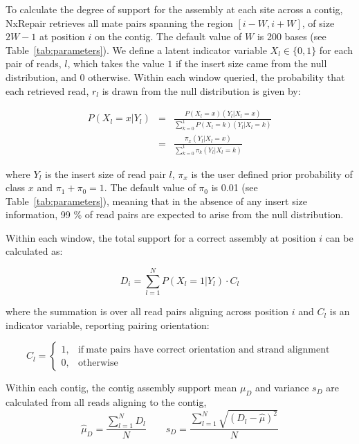 \documentclass[fleqn,10pt]{wlpeerj}
\begin{document}
To calculate the degree of support for the assembly at each site across a contig, NxRepair retrieves all mate pairs spanning the region $[i-W, i+W]$, of size $2W-1$ at position $i$ on the contig. The default value of $W$ is 200 bases (see Table~\ref{tab:parameters}). We define a latent indicator variable $X_l\in\{0,1\}$ for each pair of reads, $l$, which takes the value $1$ if the insert size came from the null distribution, and $0$ otherwise. Within each window queried, the probability that each retrieved read, $r_l$ is drawn from the null distribution is given by:

\begin{eqnarray} P(X_l=x|Y_l)& =& \frac{P(X_l=x)(Y_l|X_l=x)}{\sum_{k=0}^1P(X_l=k)(Y_l|X_l=k)}\\
  & =& \frac{\pi_x(Y_l|X_l=x)}{\sum_{k=0}^1 \pi_k(Y_l|X_l=k)}
\label{eq:posterior}  
\end{eqnarray}

where $Y_l$ is the insert size of read pair $l$, $\pi_x$ is the user defined prior probability of class $x$ and $\pi_1 + \pi_0 = 1$. The default value of $\pi_0$ is 0.01 (see Table~\ref{tab:parameters}), meaning that in the absence of any insert size information, 99 \% of read pairs are expected to arise from the null distribution.  

Within each window, the total support for a correct assembly at position $i$ can be calculated as:

\begin{equation}
D_i = \sum_{l=1}^N P(X_l=1|Y_l)\cdot C_l
\end{equation}

where the summation is over all read pairs aligning across position $i$ and $C_l$ is an indicator variable, reporting pairing orientation:

\begin{equation}
    C_l=
    \begin{cases}
      1, & \text{if}\ \text{mate pairs have correct orientation and strand alignment} \\
      0, & \text{otherwise}
    \end{cases}
  \label{eq:C}
  \end{equation}

Within each contig, the contig assembly support mean $\mu_D$ and variance $s_D$ are calculated from all reads aligning to the contig,
\begin{equation}
\hat{\mu}_D = \frac{\sum_{l=1}^N D_l}{N} \qquad s_D = \frac{\sum_{l=1}^N \sqrt{(D_l - \hat{\mu})^2}}{N}
\label{eq:contigD}
\end{equation}
\end{document}
